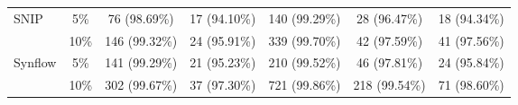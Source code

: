 \begin{table}[htbp]
{\begin{tabular}{lcccccc}
SNIP & 5\% & 76 \scriptsize{(98.69\%)} & 17 \scriptsize{(94.10\%)} & 140 \scriptsize{(99.29\%)} & 28 \scriptsize{(96.47\%)} & 18 \scriptsize{(94.34\%)} \\
 & 10\% & 146 \scriptsize{(99.32\%)} & 24 \scriptsize{(95.91\%)} & 339 \scriptsize{(99.70\%)} & 42 \scriptsize{(97.59\%)} & 41 \scriptsize{(97.56\%)} \\
Synflow & 5\% & 141 \scriptsize{(99.29\%)} & 21 \scriptsize{(95.23\%)} & 210 \scriptsize{(99.52\%)} & 46 \scriptsize{(97.81\%)} & 24 \scriptsize{(95.84\%)} \\
 & 10\% & 302 \scriptsize{(99.67\%)} & 37 \scriptsize{(97.30\%)} & 721 \scriptsize{(99.86\%)} & 218 \scriptsize{(99.54\%)} & 71 \scriptsize{(98.60\%)} \\
\hline\hline
\end{tabular}
}
\label{tab:interpolated_cr_by_method}
\end{table}